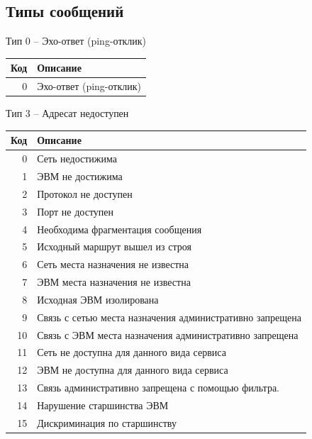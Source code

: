 \subsection{Типы сообщений}
\begin{frame}{Тип 0 -- Эхо-ответ (ping-отклик)}
	\scriptsize
	\begin{table}[ht]
	\centering
	\begin{tabular}[c]{r|l}
Код & Описание \\
	\hline
		0 & Эхо-ответ (ping-отклик)\\
	\end{tabular}
	\end{table}
	\normalsize
\end{frame}

\begin{frame}{Тип 3 -- Адресат недоступен}
	\scriptsize
	\begin{table}[ht]
	\centering
	\begin{tabular}[c]{r|l}
Код & Описание \\
	\hline
		0 & Сеть недостижима\\
		1 & ЭВМ не достижима\\
		2 & Протокол не доступен\\
		3 & Порт не доступен\\
		4 & Необходима фрагментация сообщения\\
		5 & Исходный маршрут вышел из строя\\
		6 & Сеть места назначения не известна\\
		7 & ЭВМ места назначения не известна\\
		8 & Исходная ЭВМ изолирована\\
		9 & Связь с сетью места назначения административно запрещена\\
		10 & Связь с ЭВМ места назначения административно запрещена\\
		11 & Сеть не доступна для данного вида сервиса\\
		12 & ЭВМ не доступна для данного вида сервиса\\
		13 & Связь административно запрещена с помощью фильтра.\\
		14 & Нарушение старшинства ЭВМ\\
		15 & Дискриминация по старшинству\\
	\end{tabular}
	\end{table}
	\normalsize
\end{frame}

